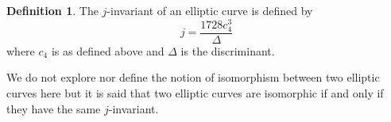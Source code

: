 \documentclass{article}
\theoremstyle{definition}
\newtheorem{definition}{Definition}[section]
\theoremstyle{definition}
\theoremstyle{definition}
\begin{document}



\begin{definition}
    The $j$-invariant of an elliptic curve is defined by
    $$j=\frac{1728c_4^3}{\Delta}$$
    where $c_4$ is as defined above and $\Delta$ is the discriminant.
\end{definition}


We do not explore nor define the notion of isomorphism between two elliptic curves here but it is said that two elliptic curves are isomorphic if and only if they have the same $j$-invariant. 







\end{document}
